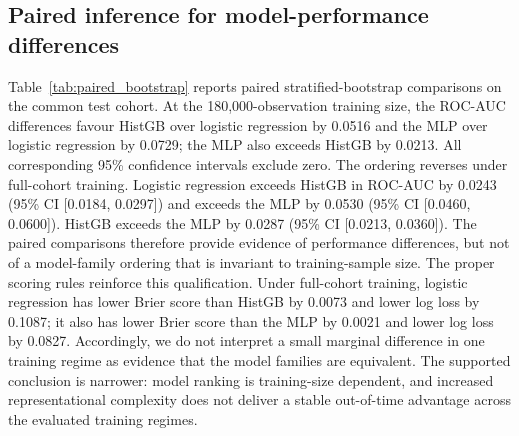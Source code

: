 \documentclass[10pt]{article}
\begin{document}
\subsection{Paired inference for model-performance differences}
\label{sec:pairedinference}

Table~\ref{tab:paired_bootstrap} reports paired stratified-bootstrap comparisons on the common test cohort. At the 180,000-observation training size, the ROC-AUC differences favour HistGB over logistic regression by 0.0516 and the MLP over logistic regression by 0.0729; the MLP also exceeds HistGB by 0.0213. All corresponding 95\% confidence intervals exclude zero. The ordering reverses under full-cohort training. Logistic regression exceeds HistGB in ROC-AUC by 0.0243 (95\% CI [0.0184, 0.0297]) and exceeds the MLP by 0.0530 (95\% CI [0.0460, 0.0600]). HistGB exceeds the MLP by 0.0287 (95\% CI [0.0213, 0.0360]). The paired comparisons therefore provide evidence of performance differences, but not of a model-family ordering that is invariant to training-sample size. The proper scoring rules reinforce this qualification. Under full-cohort training, logistic regression has lower Brier score than HistGB by 0.0073 and lower log loss by 0.1087; it also has lower Brier score than the MLP by 0.0021 and lower log loss by 0.0827. Accordingly, we do not interpret a small marginal difference in one training regime as evidence that the model families are equivalent. The supported conclusion is narrower: model ranking is training-size dependent, and increased representational complexity does not deliver a stable out-of-time advantage across the evaluated training regimes.
\end{document}
